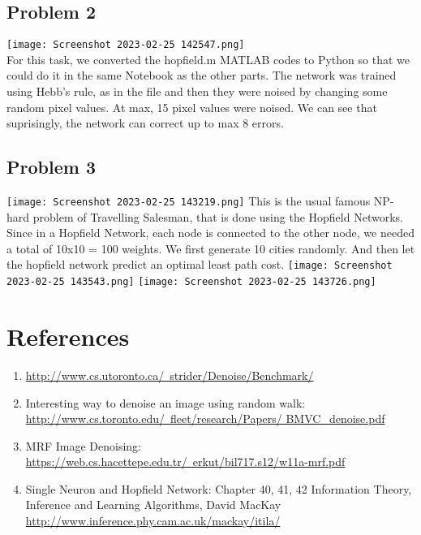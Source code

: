\documentclass[conference]{IEEEtran}
\begin{document}
\subsection{Problem 2}
\texttt{[image: Screenshot 2023-02-25 142547.png]}\\
For this task, we converted the hopfield.m MATLAB codes
to Python so that we could do it in the same Notebook as the other parts. The network was trained using Hebb’s rule, as in the file and then they were noised by changing some random pixel values. At max, 15 pixel values were noised. We can see that suprisingly, the network can correct up to max 8 errors.
\subsection{Problem 3}
\texttt{[image: Screenshot 2023-02-25 143219.png]}
This is the usual famous NP-hard problem of Travelling
Salesman, that is done using the Hopfield Networks.
Since in a Hopfield Network, each node is connected to
the other node, we needed a total of 10x10 = 100 weights.
We first generate 10 cities randomly. And then let the hopfield network predict an optimal least
path cost.
\texttt{[image: Screenshot 2023-02-25 143543.png]}
\texttt{[image: Screenshot 2023-02-25 143726.png]}


\section{References}
\begin{enumerate}
    \item  \href{http://www.cs.utoronto.ca/~strider/Denoise/Benchmark/}{http://www.cs.utoronto.ca/~strider/Denoise/Benchmark/}
    \item  Interesting way to denoise an image using random walk: \href{http://www.cs.toronto.edu/~fleet/research/Papers/BMVC_denoise.pdf} {http://www.cs.toronto.edu/~fleet/research/Papers/
    BMVC_denoise.pdf}
    \item MRF Image Denoising: \href{https://web.cs.hacettepe.edu.tr/~erkut/bil717.s12/w11a-mrf.pdf}
{https://web.cs.hacettepe.edu.tr/~erkut/bil717.s12/w11a-mrf.pdf }
    \item Single Neuron and Hopfield Network: Chapter 40, 41, 42 Information Theory, Inference and Learning Algorithms, David MacKay
\href{http://www.inference.phy.cam.ac.uk/mackay/itila/}
{http://www.inference.phy.cam.ac.uk/mackay/itila/}

\end{enumerate}
\end{document}
